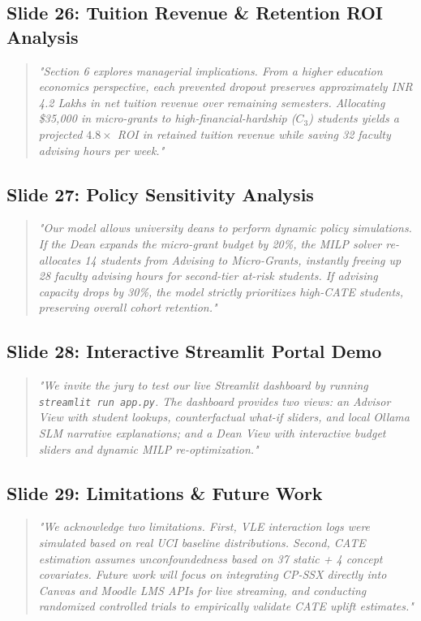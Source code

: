 \documentclass[11pt, a4paper]{article}
\begin{document}
\subsection{Slide 26: Tuition Revenue \& Retention ROI Analysis}
\begin{quote}\small \itshape
"Section 6 explores managerial implications. From a higher education economics perspective, each prevented dropout preserves approximately INR 4.2 Lakhs in net tuition revenue over remaining semesters. Allocating \$35,000 in micro-grants to high-financial-hardship ($C_3$) students yields a projected $4.8\times$ ROI in retained tuition revenue while saving 32 faculty advising hours per week."
\end{quote}

\subsection{Slide 27: Policy Sensitivity Analysis}
\begin{quote}\small \itshape
"Our model allows university deans to perform dynamic policy simulations. If the Dean expands the micro-grant budget by 20\%, the MILP solver re-allocates 14 students from Advising to Micro-Grants, instantly freeing up 28 faculty advising hours for second-tier at-risk students. If advising capacity drops by 30\%, the model strictly prioritizes high-CATE students, preserving overall cohort retention."
\end{quote}

\subsection{Slide 28: Interactive Streamlit Portal Demo}
\begin{quote}\small \itshape
"We invite the jury to test our live Streamlit dashboard by running \texttt{streamlit run app.py}. The dashboard provides two views: an Advisor View with student lookups, counterfactual what-if sliders, and local Ollama SLM narrative explanations; and a Dean View with interactive budget sliders and dynamic MILP re-optimization."
\end{quote}

\subsection{Slide 29: Limitations \& Future Work}
\begin{quote}\small \itshape
"We acknowledge two limitations. First, VLE interaction logs were simulated based on real UCI baseline distributions. Second, CATE estimation assumes unconfoundedness based on 37 static + 4 concept covariates. Future work will focus on integrating CP-SSX directly into Canvas and Moodle LMS APIs for live streaming, and conducting randomized controlled trials to empirically validate CATE uplift estimates."
\end{quote}
\end{document}
